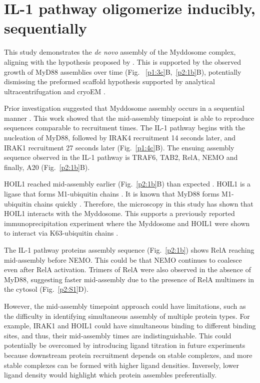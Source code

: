\section{IL-1 pathway oligomerize inducibly, sequentially}
This study demonstrates the \emph{de novo} assembly of the Myddosome complex, aligning with the hypothesis proposed by \autocite{Lin_2010}. This is supported by the observed growth of MyD88 assemblies over time (Fig. ~\ref{p1:3c}B,~\ref{p2:1b}B), potentially dismissing the preformed scaffold hypothesis supported by analytical ultracentrifugation and cryoEM \autocite{Motshwene_2009}\autocite{Moncrieffe_2020}.

Prior investigation suggested that Myddosome assembly occurs in a sequential manner \autocite{Lin_2010}\autocite{Moncrieffe_2020}. This work showed that the mid-assembly timepoint is able to reproduce sequences comparable to recruitment times. The IL-1 pathway begins with the nucleation of MyD88, followed by IRAK4 recruitment 14 seconds later, and IRAK1 recruitment 27 seconds later (Fig.~\ref{p1:4c}B). The ensuing assembly sequence observed in the IL-1 pathway is TRAF6, TAB2, RelA, NEMO and finally, A20 (Fig.~\ref{p2:1b}B).

HOIL1 reached mid-assembly earlier (Fig.~\ref{p2:1b}B) than expected \autocite{Cohen_2020}. HOIL1 is a ligase that forms M1-ubiquitin chains \autocite{Kelsall_2019}. It is known that MyD88 forms M1-ubiquitin chains quickly \autocite{Cohen_2020}\autocite{Cohen_2017}. Therefore, the microscopy in this study has shown that HOIL1 interacts with the Myddosome. This supports a previously reported immunoprecipitation experiment where the Myddosome and HOIL1 were shown to interact via K63-ubiquitin chains \autocite{Kelsall_2019}.

The IL-1 pathway proteins assembly sequence (Fig.~\ref{p2:1b}) shows RelA reaching mid-assembly before NEMO. This could be that NEMO continues to coalesce even after RelA activation. Trimers of RelA were also observed in the absence of MyD88, suggesting faster mid-assembly due to the presence of RelA multimers in the cytosol (Fig.~\ref{p2:S1}D).

However, the mid-assembly timepoint approach could have limitations, such as the difficulty in identifying simultaneous assembly of multiple protein types. For example, IRAK1 and HOIL1 could have simultaneous binding to different binding sites, and thus, their mid-assembly times are indistinguishable. This could potentially be overcomed by introducing ligand titration in future experiments because downstream protein recruitment depends on stable complexes, and more stable complexes can be formed with higher ligand densities. Inversely, lower ligand density would highlight which protein assembles preferentially.

